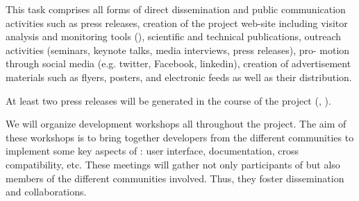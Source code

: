 \begin{workpackage}[id=dissem,wphases=18-48!.5,
  title=Dissemination and Community Building,
  lead=PS,
  PSRM=10, %
  SARM=18,
  USORM=10,
  USHRM=8,
  USRM=24,
  UVRM=2,
  UBRM=4,
]
\begin{tasklist}
\begin{task}[title=Dissemination and Communication activities]


  This task comprises all forms of direct dissemination and public
  communication activities such as press releases, creation of the
  project web-site including visitor analysis and monitoring tools
  (), scientific and technical publications, outreach
  activities (seminars, keynote talks, media interviews, press
  releases), pro- motion through social media (e.g. twitter, Facebook,
  linkedin), creation of
  advertisement materials such as flyers, posters, and electronic
  feeds as well as their distribution.


  At least two press releases will be generated in the course of the
  project (, ).
  
\end{task}

\begin{task}[title=Organization of development workshops]

We will organize development workshops all throughout the project. The aim of these workshops
is to bring together developers from the different communities to implement some key aspects of \TheProject: user interface, documentation, cross compatibility, etc. These meetings will gather not only participants of \TheProject but also members of the different communities involved. Thus, they foster dissemination and  collaborations.


\end{task}
\end{tasklist}
\end{workpackage}
